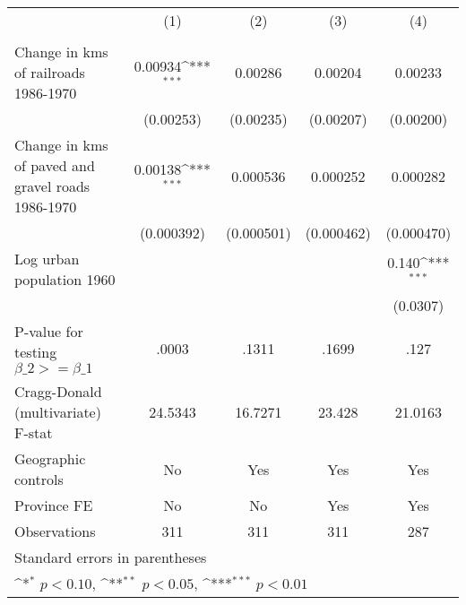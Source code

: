 {
\def\sym#1{\ifmmode^{#1}\else\(^{#1}\)\fi}
\begin{tabular}{l*{4}{c}}
\hline\hline
                &\multicolumn{1}{c}{(1)}&\multicolumn{1}{c}{(2)}&\multicolumn{1}{c}{(3)}&\multicolumn{1}{c}{(4)}\\
                &\multicolumn{1}{c}{}&\multicolumn{1}{c}{}&\multicolumn{1}{c}{}&\multicolumn{1}{c}{}\\
\hline
Change in kms of railroads 1986-1970&  0.00934\sym{***}&  0.00286         &  0.00204         &  0.00233         \\
                &(0.00253)         &(0.00235)         &(0.00207)         &(0.00200)         \\
[1em]
Change in kms of paved and gravel roads 1986-1970&  0.00138\sym{***}& 0.000536         & 0.000252         & 0.000282         \\
                &(0.000392)         &(0.000501)         &(0.000462)         &(0.000470)         \\
[1em]
Log urban population 1960&                  &                  &                  &    0.140\sym{***}\\
                &                  &                  &                  & (0.0307)         \\
\hline
P-value for testing $\beta\_{2} >= \beta\_{1}$&    .0003         &    .1311         &    .1699         &     .127         \\
Cragg-Donald (multivariate) F-stat&  24.5343         &  16.7271         &   23.428         &  21.0163         \\
Geographic controls&       No         &      Yes         &      Yes         &      Yes         \\
Province FE     &       No         &       No         &      Yes         &      Yes         \\
Observations    &      311         &      311         &      311         &      287         \\
\hline\hline
\multicolumn{5}{l}{\footnotesize Standard errors in parentheses}\\
\multicolumn{5}{l}{\footnotesize \sym{*} \(p<0.10\), \sym{**} \(p<0.05\), \sym{***} \(p<0.01\)}\\
\end{tabular}
}
